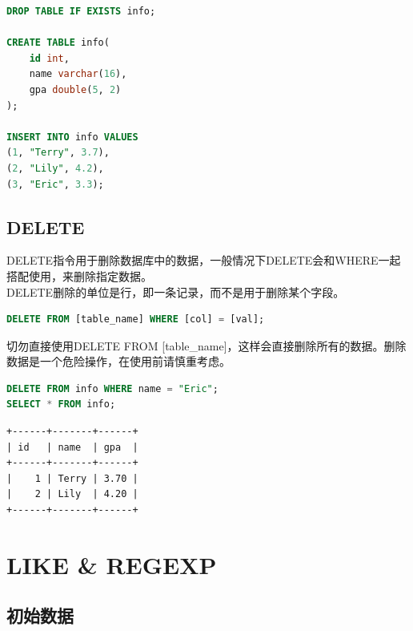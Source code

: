 \documentclass[12pt, openany, oneside]{book}
\begin{document}

\begin{lstlisting}[language=SQL]
DROP TABLE IF EXISTS info;

CREATE TABLE info(
    id int,
    name varchar(16),
    gpa double(5, 2)
);

INSERT INTO info VALUES
(1, "Terry", 3.7),
(2, "Lily", 4.2),
(3, "Eric", 3.3);
\end{lstlisting}

\section{DELETE}

DELETE指令用于删除数据库中的数据，一般情况下DELETE会和WHERE一起搭配使用，来删除指定数据。 \\

DELETE删除的单位是行，即一条记录，而不是用于删除某个字段。

\vspace{-0.5cm}

\begin{lstlisting}[language=SQL]
DELETE FROM [table_name] WHERE [col] = [val];
\end{lstlisting}

切勿直接使用DELETE FROM [table\_name]，这样会直接删除所有的数据。删除数据是一个危险操作，在使用前请慎重考虑。 \\


\begin{lstlisting}[language=SQL]
DELETE FROM info WHERE name = "Eric";
SELECT * FROM info;
\end{lstlisting}

\begin{tcolorbox}
    \begin{verbatim}
+------+-------+------+
| id   | name  | gpa  |
+------+-------+------+
|    1 | Terry | 3.70 |
|    2 | Lily  | 4.20 |
+------+-------+------+
    \end{verbatim}
\end{tcolorbox}

\newpage

\chapter{LIKE \& REGEXP}

\section{初始数据}
\end{document}
